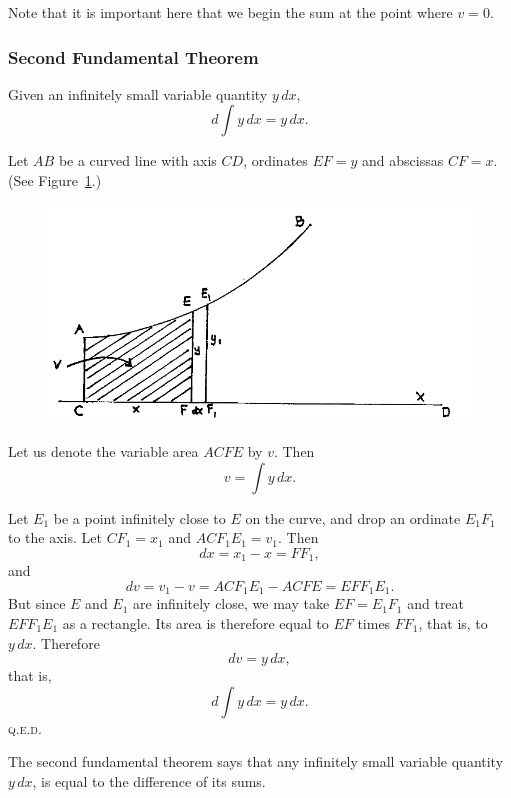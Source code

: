 \documentclass[polutonikogreek,english,twoside,openright]{article}
\begin{document}
Note that it is important here that we begin the sum at the point where $v=0$.


\subsubsection*{Second Fundamental Theorem}
\label{fund2}  Given an infinitely small variable quantity $y\,dx$,
$$d\int\!y\,dx = y\,dx.$$

Let $AB$ be a curved line with axis $CD$, ordinates $EF=y$ and
abscissas $CF = x$.  (See Figure~\ref{sfundfig}.)
\begin{figure}[htp]
  \begin{center}
    \includegraphics[width=\textwidth]{fig/Figure38}
    \caption{}
    \label{sfundfig}
    \vspace{-10pt}
  \end{center}
\end{figure}

Let us denote the variable area $ACFE$ by $v$.  Then 
$$v = \int\!y\,dx.$$

Let $E_1$ be a point infinitely close to $E$ on the curve, and drop an
ordinate $E_1F_1$ to the axis.  Let $CF_1 = x_1$ and $ACF_1E_1 = v_1$.
Then
$$dx = x_1 - x = FF_1,$$
and
$$dv = v_1 - v = ACF_1E_1 - ACFE = EFF_1E_1.$$
But since $E$ and $E_1$ are infinitely close, we may take
$EF = E_1F_1$ and treat $EFF_1E_1$ as a rectangle.  Its area is
therefore equal to $EF$ times $FF_1$, that is, to $y\,dx$.  Therefore
$$dv = y\,dx,$$
that is,
$$d\int\!y\,dx = y\,dx.$$
\textsc{q.e.d.}

The second fundamental theorem says that any infinitely small variable
quantity $y\,dx$, is equal to the difference of its sums.
\end{document}
